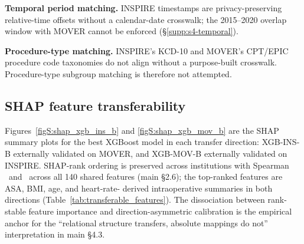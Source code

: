 \documentclass[11pt,a4paper]{article}
\begin{document}
\textbf{Temporal period matching.} INSPIRE timestamps are
privacy-preserving relative-time offsets without a calendar-date
crosswalk; the 2015--2020 overlap window with MOVER cannot be enforced
(\S\ref{supp:s4-temporal}).

\textbf{Procedure-type matching.} INSPIRE's KCD-10 and MOVER's CPT/EPIC
procedure code taxonomies do not align without a purpose-built crosswalk.
Procedure-type subgroup matching is therefore not attempted.

\subsection{SHAP feature transferability}\label{supp:s5-shap}

Figures~\ref{figS:shap_xgb_ins_b} and \ref{figS:shap_xgb_mov_b} are the
SHAP summary plots for the best XGBoost model in each transfer direction:
XGB-INS-B externally validated on MOVER, and XGB-MOV-B externally
validated on INSPIRE. SHAP-rank ordering is preserved across institutions
with Spearman \pnShapSpearmanRhoXgbInsBFull\ and
\pnShapSpearmanRhoXgbMovBFull\ across all 140 shared features
(main \S2.6); the top-ranked features are ASA, BMI, age, and heart-rate-
derived intraoperative summaries in both directions
(Table~\ref{tab:transferable_features}). The dissociation between
rank-stable feature importance and direction-asymmetric calibration is
the empirical anchor for the ``relational structure transfers, absolute
mappings do not'' interpretation in main \S4.3.
\end{document}
